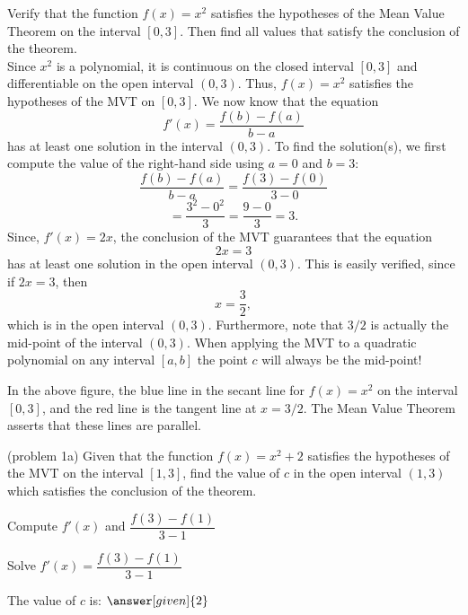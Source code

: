 \documentclass{ximera}
\begin{document}
\begin{example}[example 1]
Verify that the function $f(x) = x^2$ satisfies the hypotheses of the Mean Value Theorem
on the interval $[0,3]$. Then find all values that satisfy the conclusion of the theorem.\\
Since $x^2$ is a polynomial, it is continuous on the closed interval $[0, 3]$ and differentiable on the open interval $(0, 3)$. 
Thus, $f(x) = x^2$ satisfies the hypotheses of the MVT on $[0, 3]$. We now know that the equation
\[
f'(x) = \frac{f(b) - f(a)}{b-a}
\]
has at least one solution in the interval $(0, 3)$. To find the solution(s), 
we first compute the value of the right-hand side using $a = 0$ and $b = 3$:
\[\frac{f(b) - f(a)}{b-a} = \frac{f(3) - f(0)}{3-0} \]
\[= \frac{3^2 - 0^2}{3}= \frac{9 - 0}{3} = 3.\]
Since, $f'(x) = 2x$,
the conclusion of the MVT guarantees that the equation
\[2x = 3\]
has at least one solution in the open interval $(0,3)$.
This is easily verified, since if $2x = 3$, then 
\[x = \frac{3}{2},
\]
which is in the open interval $(0, 3)$.
Furthermore, note that $3/2$ is actually the mid-point of the interval $(0, 3)$.
When applying the MVT to a quadratic polynomial on any interval $[a, b]$ the point $c$ will always be the mid-point!


\begin{image}
\end{image}

In the above figure, the blue line in the secant line for $f(x) = x^2$ on the interval $[0, 3]$, 
and the red line is the tangent line at $x = 3/2$. The Mean Value Theorem asserts that these lines are parallel.
\end{example}

\begin{problem}(problem 1a)
  Given that the function $f(x) = x^2 + 2$ satisfies the hypotheses of the MVT on the
	interval $[1,3]$, find the value of $c$ in the open interval $(1,3)$ which satisfies 
	the conclusion of the theorem.
	
    \begin{hint}
      Compute $f'(x)$ and $\dfrac{f(3) - f(1)}{3-1}$
    \end{hint}
		\begin{hint}
		  Solve $f'(x) = \dfrac{f(3) - f(1)}{3-1}$
		\end{hint}
		
		The value of $c$ is:
		 $\answer[given]{2}$
\end{problem}
\end{document}
